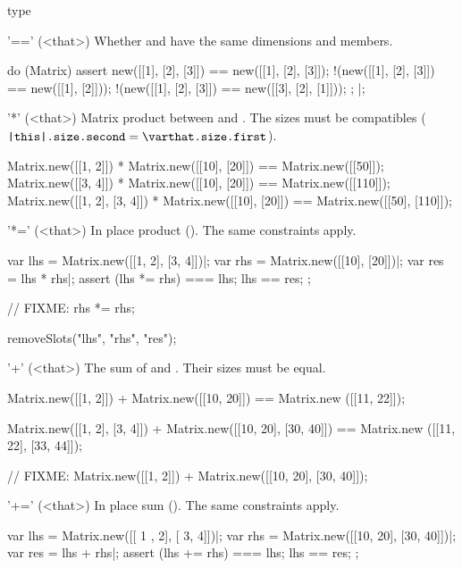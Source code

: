 \begin{urbiscriptapi}
\item[type]%
\begin{urbiassert}

\end{urbiassert}

\item['=='](<that>)%
  Whether \this and \that have the same dimensions and members.
\begin{urbiscript}
do (Matrix)
{
  assert
  {
      new([[1], [2], [3]]) == new([[1], [2], [3]]);
    !(new([[1], [2], [3]]) == new([[1], [2]]));
    !(new([[1], [2], [3]]) == new([[3], [2], [1]]));
  };
}|;
\end{urbiscript}

\item['*'](<that>)%
  Matrix product between \this and \that.  The sizes must be compatibles
  ($\texttt{\this.size.second} = \texttt{\that.size.first}$).
\begin{urbiassert}
Matrix.new([[1, 2]]) * Matrix.new([[10], [20]])
  == Matrix.new([[50]]);
Matrix.new([[3, 4]]) * Matrix.new([[10], [20]])
  == Matrix.new([[110]]);
Matrix.new([[1, 2], [3, 4]]) * Matrix.new([[10], [20]])
  == Matrix.new([[50], [110]]);
\end{urbiassert}

\item['*='](<that>)%
  In place product ().  The same constraints apply.
\begin{urbiscript}
var lhs = Matrix.new([[1, 2], [3, 4]])|;
var rhs = Matrix.new([[10], [20]])|;
var res = lhs * rhs|;
assert
{
  (lhs *= rhs) === lhs;
  lhs == res;
};

// FIXME: rhs *= rhs;
\end{urbiscript}
\begin{urbicomment}
  removeSlots("lhs", "rhs", "res");
\end{urbicomment}


\item['+'](<that>)%
  The sum of \this and \that.  Their sizes must be equal.
\begin{urbiassert}
Matrix.new([[1, 2]]) + Matrix.new([[10, 20]])
  == Matrix.new ([[11, 22]]);

Matrix.new([[1, 2], [3, 4]]) + Matrix.new([[10, 20], [30, 40]])
  == Matrix.new ([[11, 22], [33, 44]]);

// FIXME: Matrix.new([[1, 2]]) + Matrix.new([[10, 20], [30, 40]]);
\end{urbiassert}

\item['+='](<that>)%
  In place sum ().   The same constraints apply.
\begin{urbiscript}
var lhs = Matrix.new([[ 1 , 2], [ 3,  4]])|;
var rhs = Matrix.new([[10, 20], [30, 40]])|;
var res = lhs + rhs|;
assert
{
  (lhs += rhs) === lhs;
  lhs == res;
};


\end{urbiscript}
\end{urbiscriptapi}
